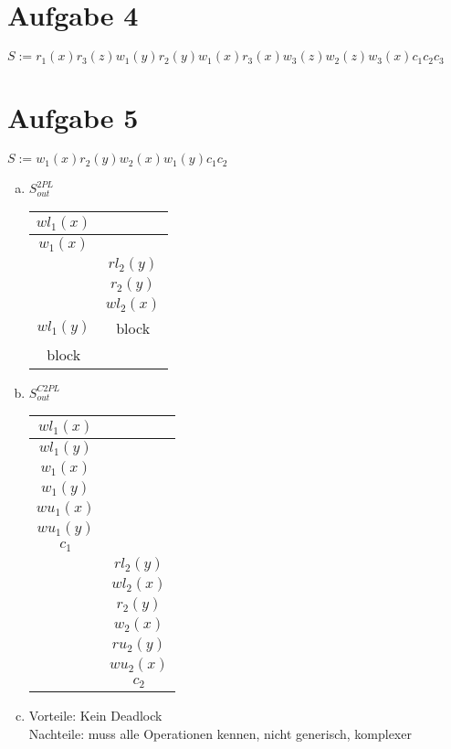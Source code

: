 \documentclass{scrartcl}
\begin{document}
\section*{Aufgabe 4}
$S := r_1(x)r_3(z)w_1(y)r_2(y)w_1(x)r_3(x)w_3(z)w_2(z)w_3(x)c_1c_2c_3$

\section*{Aufgabe 5}
$S := w_1(x)r_2(y)w_2(x)w_1(y)c_1c_2$
\begin{enumerate}[a)]
\item
$S^{2PL}_{out}$\\
\begin{tabular}{|c|c|}
\hline $wl_1(x)$ &  \\ 
\hline $w_1(x)$ &  \\ 
\hline  & $rl_2(y)$ \\ 
\hline  & $r_2(y)$ \\ 
\hline  & $wl_2(x)$ \\ 
\hline $wl_1(y)$ & block \\ 
\hline block &  \\ 
\hline 
\end{tabular} 

\item
$S^{C2PL}_{out}$\\
\begin{tabular}{|c|c|}
\hline $wl_1(x)$ &  \\ 
\hline $wl_1(y)$ &  \\ 
\hline $w_1(x)$ &  \\ 
\hline $w_1(y)$ &  \\ 
\hline $wu_1(x)$ &  \\
\hline $wu_1(y)$ &  \\
\hline $c_1$ &  \\ 
\hline  & $rl_2(y)$ \\ 
\hline  & $wl_2(x)$ \\ 
\hline  & $r_2(y)$ \\ 
\hline  & $w_2(x)$ \\
\hline  & $ru_2(y)$ \\ 
\hline  & $wu_2(x)$ \\
\hline  & $c_2$ \\ 
\hline 
\end{tabular} 

\item
Vorteile: Kein Deadlock\\
Nachteile: muss alle Operationen kennen, nicht generisch, komplexer\\
\end{enumerate}
\end{document}
